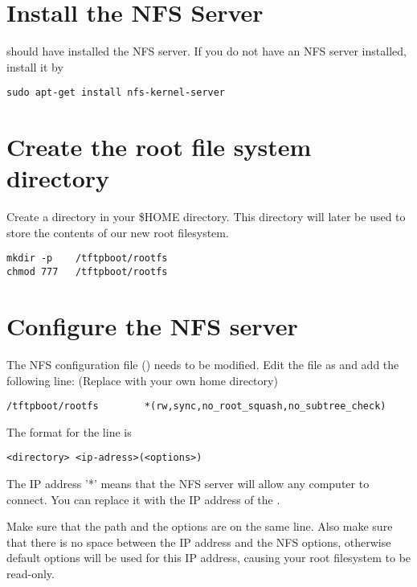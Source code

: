 
\section{Install the NFS Server}

 should have installed the NFS server.
If you do not have an NFS server installed, install it by

\begin{verbatim}
sudo apt-get install nfs-kernel-server
\end{verbatim}

\section{Create the root file system directory}

Create a  directory in your \$HOME directory. This
directory will later be used to store the contents of our new
root filesystem.

\begin{verbatim}
mkdir -p	/tftpboot/rootfs
chmod 777	/tftpboot/rootfs
\end{verbatim}

\section{Configure the NFS server}

The NFS configuration file () needs to be modified.
Edit the file as  and add the following line: (Replace  with your own home directory)

\begin{verbatim}
/tftpboot/rootfs		*(rw,sync,no_root_squash,no_subtree_check)
\end{verbatim}

The format for the line is 
\begin{verbatim}
<directory> <ip-adress>(<options>)
\end{verbatim}

The IP address '*' means that the NFS server will allow any computer to connect.
You can replace it with the IP address of the \devboard.

Make sure that the path and the options are on the same line.
Also make sure that there is no space between the IP address and the NFS
options, otherwise default options will be used for this IP address,
causing your root filesystem to be read-only.

